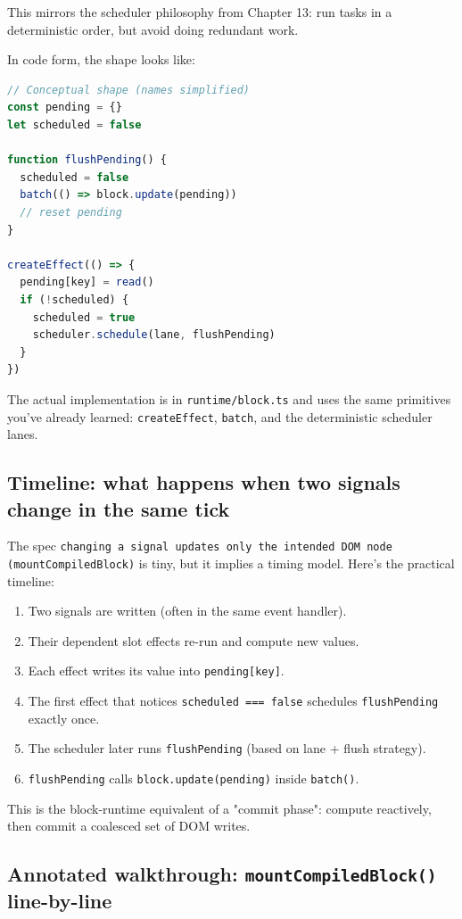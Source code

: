 This mirrors the scheduler philosophy from Chapter 13:
run tasks in a deterministic order, but avoid doing redundant work.

In code form, the shape looks like:

\begin{lstlisting}[language=JavaScript]
// Conceptual shape (names simplified)
const pending = {}
let scheduled = false

function flushPending() {
  scheduled = false
  batch(() => block.update(pending))
  // reset pending
}

createEffect(() => {
  pending[key] = read()
  if (!scheduled) {
    scheduled = true
    scheduler.schedule(lane, flushPending)
  }
})
\end{lstlisting}

The actual implementation is in \texttt{runtime/block.ts} and uses the same primitives you've already learned: \texttt{createEffect}, \texttt{batch}, and the deterministic scheduler lanes.

\subsection{Timeline: what happens when two signals change in the same tick}

The spec \texttt{changing a signal updates only the intended DOM node (mountCompiledBlock)} is tiny, but it implies a timing model.
Here's the practical timeline:

\begin{enumerate}
  \item Two signals are written (often in the same event handler).
  \item Their dependent slot effects re-run and compute new values.
  \item Each effect writes its value into \texttt{pending[key]}.
  \item The first effect that notices \texttt{scheduled === false} schedules \texttt{flushPending} exactly once.
  \item The scheduler later runs \texttt{flushPending} (based on lane + flush strategy).
  \item \texttt{flushPending} calls \texttt{block.update(pending)} inside \texttt{batch()}.
\end{enumerate}

This is the block-runtime equivalent of a "commit phase": compute reactively, then commit a coalesced set of DOM writes.

\subsection{Annotated walkthrough: \texttt{mountCompiledBlock()} line-by-line}

